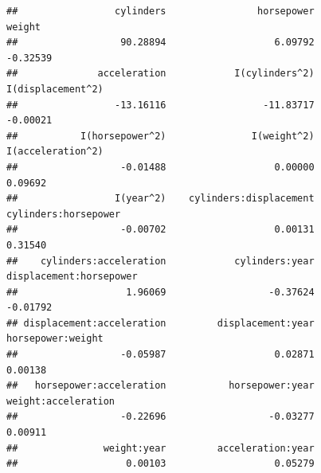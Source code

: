 \documentclass[
]{article}
\begin{document}
\begin{verbatim}
##                 cylinders                horsepower                    weight 
##                  90.28894                   6.09792                  -0.32539 
##              acceleration            I(cylinders^2)         I(displacement^2) 
##                 -13.16116                 -11.83717                  -0.00021 
##           I(horsepower^2)               I(weight^2)         I(acceleration^2) 
##                  -0.01488                   0.00000                   0.09692 
##                 I(year^2)    cylinders:displacement      cylinders:horsepower 
##                  -0.00702                   0.00131                   0.31540 
##    cylinders:acceleration            cylinders:year   displacement:horsepower 
##                   1.96069                  -0.37624                  -0.01792 
## displacement:acceleration         displacement:year         horsepower:weight 
##                  -0.05987                   0.02871                   0.00138 
##   horsepower:acceleration           horsepower:year       weight:acceleration 
##                  -0.22696                  -0.03277                   0.00911 
##               weight:year         acceleration:year 
##                   0.00103                   0.05279
\end{verbatim}
\end{document}
